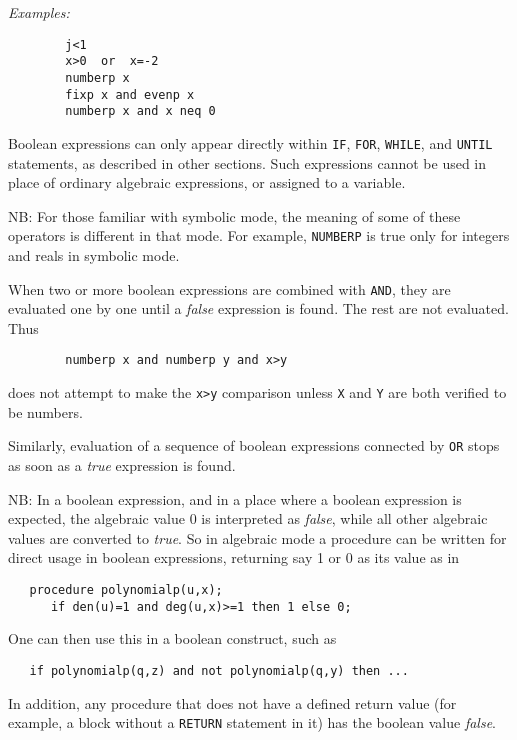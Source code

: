 \textit{Examples:}
\begin{verbatim}
        j<1
        x>0  or  x=-2
        numberp x
        fixp x and evenp x
        numberp x and x neq 0
\end{verbatim}
Boolean expressions can only appear directly within \texttt{IF}, \texttt{FOR},
\texttt{WHILE}, and \texttt{UNTIL} statements, as described in other sections.
Such expressions cannot be used in place of ordinary algebraic expressions,
or assigned to a variable.

NB:  For those familiar with symbolic mode, the meaning of some of
these operators is different in that mode.  For example, \texttt{NUMBERP} is
true only for integers and reals in symbolic mode.

\hypertarget{operator:AND}{}
When two or more boolean expressions are combined with \texttt{AND}, they are
evaluated one by one until a \emph{false} expression is found. The rest are
not evaluated. Thus
\begin{verbatim}
        numberp x and numberp y and x>y
\end{verbatim}
does not attempt to make the \texttt{x>y} comparison unless \texttt{X} and \texttt{Y}
are both verified to be numbers.

\hypertarget{operator:OR}{}
Similarly, evaluation of a sequence of boolean expressions connected by
\texttt{OR} stops as soon as a \emph{true} expression is found.

NB:  In a boolean expression, and in a place where a boolean expression is
expected, the algebraic value 0 is interpreted as \emph{false}, while all
other algebraic values are converted to \emph{true}.  So in algebraic mode
a procedure can be written for direct usage in boolean expressions,
returning say 1 or 0 as its value as in

\begin{verbatim}
   procedure polynomialp(u,x);
      if den(u)=1 and deg(u,x)>=1 then 1 else 0;
\end{verbatim}

One can then use this in a boolean construct, such as
\begin{verbatim}
   if polynomialp(q,z) and not polynomialp(q,y) then ...
\end{verbatim}

In addition, any procedure that does not have a defined return value
(for example, a block without a \texttt{RETURN} statement in it)
has the boolean value \emph{false}. 

